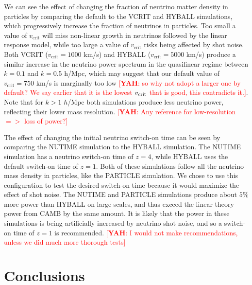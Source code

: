 \documentclass[useAMS, usenatbib]{mnras}
\newcommand{\yah}[1]{{\textcolor{red}{[{\bf YAH}: #1]}}}
\begin{document}
We can see the effect of changing the fraction of neutrino matter density in particles by comparing the default to the VCRIT and HYBALL simulations, which progressively increase the fraction of neutrinos in particles. Too small a value of $v_\mathrm{crit}$ will miss non-linear growth in neutrinos followed by the linear response model, while too large a value of $v_\mathrm{crit}$ risks being affected by shot noise. Both VCRIT ($v_\mathrm{crit} = 1000$ km/s) and HYBALL ($v_\mathrm{crit} = 5000$ km/s) produce a similar increase in the neutrino power spectrum in the quasilinear regime between $k = 0.1$ and $k = 0.5$ h/Mpc, which may suggest that our default value of $v_\mathrm{crit} = 750$ km/s is marginally too low \yah{so why not adopt a larger one by default? We say earlier that it is the lowest $v_{\rm crit}$ that is good, this contradicts it.}. Note that for $k > 1$ $h$/Mpc both simulations produce less neutrino power, reflecting their lower mass resolution. \yah{Any reference for low-resolution $=>$ loss of power?}

The effect of changing the initial neutrino switch-on time can be seen by comparing the NUTIME simulation to the HYBALL simulation.
The NUTIME simulation has a neutrino switch-on time of $z=4$, while HYBALL uses the default switch-on time of $z=1$. Both of these simulations follow all the neutrino mass density in particles, like the PARTICLE simulation. We chose to use this configuration to test the desired switch-on time because it would maximize the effect of shot noise. The NUTIME and PARTICLE simulations produce about $5\%$ more power than HYBALL on large scales, and thus exceed the linear theory power from CAMB by the same amount. It is likely that the power in these simulations is being artificially increased by neutrino shot noise, and so a switch-on time of $z=1$ is recommended. \yah{I would not make recommendations, unless we did much more thorough tests}

\section{Conclusions}
\label{sec:conclusion}
\end{document}
